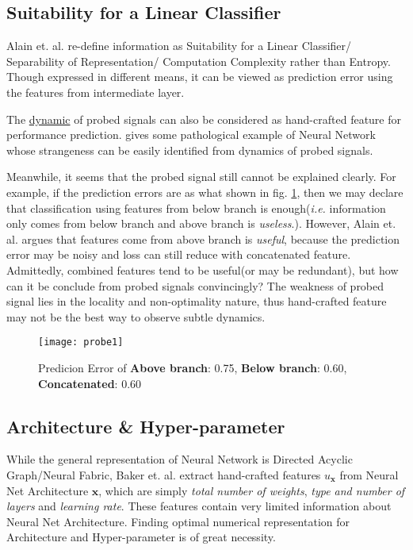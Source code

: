 \documentclass{mcmthesis}
\begin{document}

\subsection{Suitability for a Linear Classifier} 
Alain et. al.  \cite{alain2016understanding} re-define information as Suitability for a Linear Classifier/  Separability of Representation/ Computation Complexity rather than Entropy. Though expressed in different means, it can be viewed as prediction error using the features from intermediate layer. 

The \href{ https://youtu.be/x8j4ZHCR2FI }{dynamic}  of probed signals  can also be considered as  hand-crafted feature for performance prediction.  \cite{alain2016understanding} gives some pathological example of Neural Network whose strangeness can be easily identified from dynamics of probed signals.

Meanwhile, it seems that the probed signal    still cannot be explained clearly. For example, if the prediction errors are  as what shown in fig. \ref{fig:probe1}, then we may declare that classification using features from below branch is enough(\textit{i.e.} information only comes from below branch and  above branch is \textit{useless}.). However,   
Alain et. al. argues that features come from above branch is \textit{useful}, because  the prediction error may be noisy and loss can still reduce with concatenated feature.  Admittedly, combined features tend to be useful(or may be redundant), but how can it be conclude from probed signals convincingly? The weakness of probed signal lies in the locality and non-optimality nature, thus hand-crafted feature may not be the best way to observe subtle dynamics.

\begin{figure}[h]
	\centering
	\texttt{[image: probe1]}
	\caption{Predicion Error of \textbf{Above branch}: 0.75, \textbf{Below branch}: 0.60, \textbf{Concatenated}: 0.60}
	\label{fig:probe1}
\end{figure}

\subsection{Architecture \& Hyper-parameter }
While the general representation of Neural Network is Directed Acyclic Graph/Neural Fabric, Baker et. al. \cite{baker2017practical} extract hand-crafted features $u_\mathbf{x}$ from Neural Net Architecture $\mathbf{x}$, which are simply \textit{total number of weights}, \textit{type and number of layers} and \textit{learning rate}. These features contain very limited information about Neural Net Architecture. Finding optimal numerical representation for  Architecture and Hyper-parameter  is of great necessity. 
\end{document}
